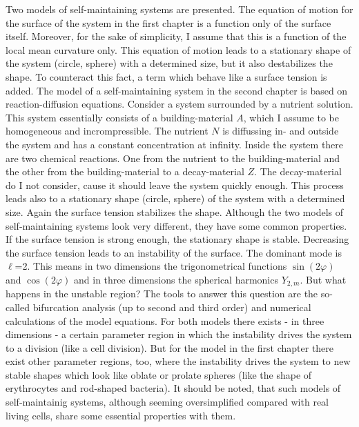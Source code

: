   Two models of  self-maintaining systems are presented.
  The equation of motion for the surface of the system
    in the first chapter is a function only of the
    surface itself. Moreover, for the sake of simplicity,
    I assume that this is a function
    of the local mean curvature only.
    This equation of motion leads to a
    stationary shape of the system (circle, sphere)
    with a determined size,
    but it also  destabilizes the shape.
    To counteract this fact, a term which behave like a
    surface tension is added.
  \newline
  The model of
    a self-maintaining system in the second chapter is
    based on reaction-diffusion equations.
    Consider a system surrounded by a nutrient solution.
    This system essentially consists of a building-material $A$,
    which I assume  to be homogeneous and incrompressible.
    The nutrient $N$ is diffussing in- and outside the system
    and has a constant          concentration at infinity.
    Inside the system there  are two chemical reactions.
    One from the nutrient
    to the building-material
    and the other from the building-material
    to a decay-material $Z$.
    The decay-material do I not consider,
    cause it should leave the system quickly enough.
    This  process   leads also to
    a stationary shape (circle, sphere) of the system
    with a determined size.
    Again the surface tension stabilizes the shape.
  \newline
  Although the two models of  self-maintaining systems
    look  very different, they have some common properties.
    If the surface tension is strong enough, the
    stationary shape is stable.
    Decreasing the surface tension leads to
    an instability of the surface.
    The dominant mode is     $\ell$=2.
    This means in two dimensions the trigonometrical functions
    $\sin (2\varphi)$ and
    $\cos (2\varphi)$ and
    in three dimensions the spherical harmonics $Y_{2 ,m}$.
  \newline
  But what happens in the unstable region?
    The tools to answer this question are the
    so-called bifurcation analysis (up to second and third order)
    and numerical calculations of the model equations.
  \newline
  For both models there exists
    - in three dimensions -  a certain parameter
    region in which the instability drives the system to a
    division
    (like a cell division).
    But for the model in the first chapter there exist other
    parameter regions, too, where the instability drives the system
    to new stable shapes which look like
    oblate  or prolate spheres
    (like the shape of erythrocytes and  rod-shaped bacteria).
  \newline
  It should be noted, that such models of
    self-maintainig systems, although seeming
    oversimplified compared with real living cells,
    share some essential properties with them.

